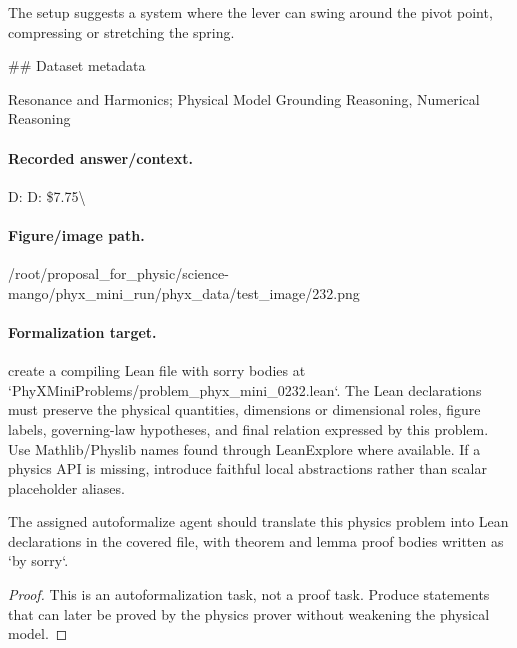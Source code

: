 The setup suggests a system where the lever can swing around the pivot point, compressing or stretching the spring.

\#\# Dataset metadata

Resonance and Harmonics; Physical Model Grounding Reasoning, Numerical Reasoning

\paragraph{Recorded answer/context.}
D: D: \$7.75\textbackslash{}

\paragraph{Figure/image path.}
/root/proposal\_for\_physic/science-mango/phyx\_mini\_run/phyx\_data/test\_image/232.png

\paragraph{Formalization target.}
create a compiling Lean file with sorry bodies at `PhyXMiniProblems/problem\_phyx\_mini\_0232.lean`. The Lean declarations must preserve the physical quantities, dimensions or dimensional roles, figure labels, governing-law hypotheses, and final relation expressed by this problem.
Use Mathlib/Physlib names found through LeanExplore where available. If a physics API is missing, introduce faithful local abstractions rather than scalar placeholder aliases.

\begin{theorem}
\label{thm:physics:phyx_mini_0232:target}
The assigned autoformalize agent should translate this physics problem into Lean declarations in the covered file, with theorem and lemma proof bodies written as `by sorry`.
\end{theorem}
\begin{proof}
This is an autoformalization task, not a proof task. Produce statements that can later be proved by the physics prover without weakening the physical model.
\end{proof}

